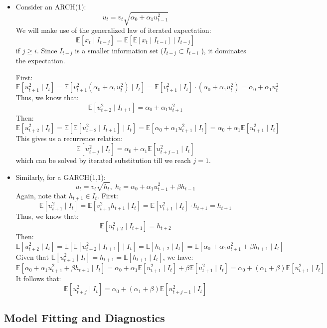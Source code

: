 \documentclass[notitlepage]{article}
\begin{document}
\begin{itemize}
    \item Consider an ARCH(1):
    \[
    u_t = v_t\sqrt{\alpha_0 + \alpha_1 u_{t-1}^2}
    \]
    We will make use of the generalized law of iterated expectation:
    \[
    \mathbb{E}[x_t \mid I_{t-j}] =  \mathbb{E}[\mathbb{E}[x_t \mid I_{t-i}]  \mid I_{t-j}]
    \]
    if \(j \ge i\). Since \(I_{t-j}\) is a smaller information set (\(I_{t-j} \subset I_{t-i}\) ), it dominates the expectation.

    First:
    \[
    \mathbb{E}[u_{t+1}^2 \mid I_t] = \mathbb{E}[v_{t+1}^2 (\alpha_0 + \alpha_1 u_t^2) \mid I_t] = \mathbb{E}[v_{t+1}^2 \mid I_{t}] \cdot (\alpha_0 + \alpha_1 u_t^2) = \alpha_0 + \alpha_1 u_t^2
    \]
    Thus, we know that:
    \[
    \mathbb{E}[u_{t+2}^2 \mid I_{t+1}] = \alpha_0 + \alpha_1 u_{t+1}^2
    \]
    Then:
    \[
    \mathbb{E}[u_{t+2}^2 \mid I_t] = \mathbb{E}[\mathbb{E}[u_{t+2}^2 \mid I_{t+1}]  \mid I_{t}] =  \mathbb{E}[\alpha_0 + \alpha_1 u_{t+1}^2 \mid I_{t}] = \alpha_0 + \alpha_1 \mathbb{E}[u_{t+1}^2 \mid I_t]
    \]
    This gives us a recurrence relation:
    \[
    \mathbb{E}[u_{t+j}^2 \mid I_t] = \alpha_0 + \alpha_1 \mathbb{E}[u_{t+j-1}^2 \mid I_t]
    \]
    which can be solved by iterated substitution till we reach \(j=1\).
    \item Similarly, for a GARCH(1,1):
    \[
    u_t = v_t\sqrt{h_t}, \;h_t = \alpha_0 + \alpha_1 u_{t-1}^2 + \beta h_{t-1}
    \]
    Again, note that \(h_{t+1} \in I_t\). First:
    \[
    \mathbb{E}[u_{t+1}^2 \mid I_t] = \mathbb{E}[v_{t+1}^2 h_{t+1} \mid I_t] = \mathbb{E}[v_{t+1}^2 \mid I_{t}] \cdot h_{t+1} = h_{t+1}
    \]
    Thus, we know that:
    \[
    \mathbb{E}[u_{t+2}^2 \mid I_{t+1}] = h_{t+2}
    \]
    Then:
    \[
    \mathbb{E}[u_{t+2}^2 \mid I_t] = \mathbb{E}[\mathbb{E}[u_{t+2}^2 \mid I_{t+1}]  \mid I_{t}] = \mathbb{E}[h_{t+2} \mid I_{t}] = \mathbb{E}[\alpha_0 + \alpha_1 u_{t+1}^2 + \beta h_{t+1} \mid I_{t}]
    \]
    Given that \(\mathbb{E}[u_{t+1}^2 \mid I_t] = h_{t+1} = \mathbb{E}[h_{t+1} \mid I_t]\), we have:
    \[
    \mathbb{E}[\alpha_0 + \alpha_1 u_{t+1}^2 + \beta h_{t+1} \mid I_{t}] = \alpha_0 + \alpha_1 \mathbb{E}[u_{t+1}^2 \mid I_t] + \beta \mathbb{E}[u_{t+1}^2 \mid I_t] = \alpha_0 + (\alpha_1 + \beta) \mathbb{E}[u_{t+1}^2 \mid I_t]
    \]
    It follows that:
    \[
    \mathbb{E}[u_{t+j}^2 \mid I_t] = \alpha_0 + (\alpha_1 + \beta) \mathbb{E}[u_{t+j-1}^2 \mid I_t]
    \]
\end{itemize}

\subsection{Model Fitting and Diagnostics}
\end{document}
